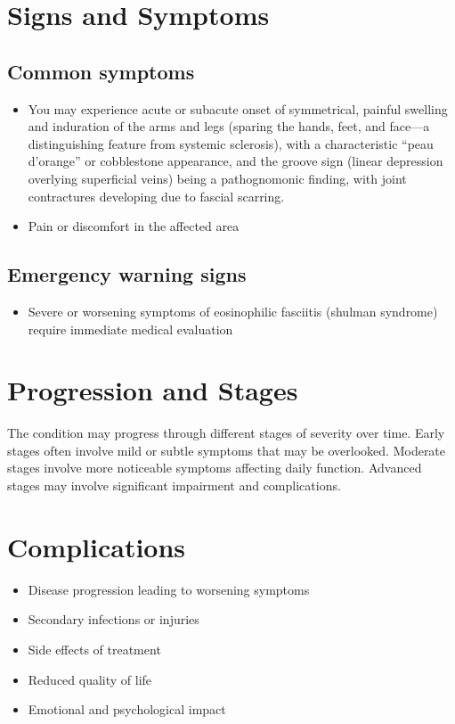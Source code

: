\section{Signs and Symptoms}

\subsection{Common symptoms}
\begin{itemize}[noitemsep]
  \item You may experience acute or subacute onset of symmetrical, painful swelling and induration of the arms and legs (sparing the hands, feet, and face---a distinguishing feature from systemic sclerosis), with a characteristic ``peau d'orange'' or cobblestone appearance, and the groove sign (linear depression overlying superficial veins) being a pathognomonic finding, with joint contractures developing due to fascial scarring.

  \item Pain or discomfort in the affected area
  \end{itemize}

\subsection{Emergency warning signs}
\begin{itemize}[noitemsep]
  \item Severe or worsening symptoms of eosinophilic fasciitis (shulman syndrome) require immediate medical evaluation
\end{itemize}
\section{Progression and Stages}
The condition may progress through different stages of severity over time. Early stages often involve mild or subtle symptoms that may be overlooked. Moderate stages involve more noticeable symptoms affecting daily function. Advanced stages may involve significant impairment and complications.
\section{Complications}
\begin{itemize}[noitemsep]
  \item Disease progression leading to worsening symptoms
  \item Secondary infections or injuries
  \item Side effects of treatment
  \item Reduced quality of life
  \item Emotional and psychological impact
\end{itemize}
